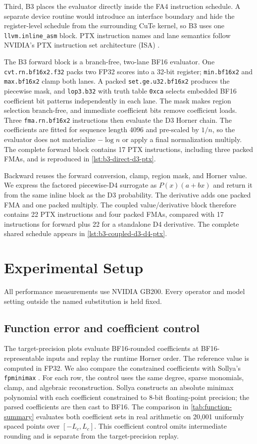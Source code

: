 \documentclass[11pt]{article}
\begin{document}
Third, B3 places the evaluator directly inside the FA4 instruction schedule.
A separate device routine would introduce an interface boundary and hide the
register-level schedule from the surrounding CuTe kernel, so B3 uses one
\texttt{llvm.inline\_asm} block. PTX instruction names and lane semantics
follow NVIDIA's PTX instruction set architecture (ISA) \cite{nvidia2026ptxisa}.

The B3 forward block is a branch-free, two-lane BF16 evaluator. One
\texttt{cvt.rn.bf16x2.f32} packs two FP32 scores into a 32-bit register;
\texttt{min.bf16x2} and \texttt{max.bf16x2} clamp both lanes. A packed
\texttt{set.ge.u32.bf16x2} produces the piecewise mask, and
\texttt{lop3.b32} with truth table \texttt{0xca} selects embedded BF16
coefficient bit patterns independently in each lane. The mask makes region
selection branch-free, and immediate coefficient bits remove coefficient
loads. Three \texttt{fma.rn.bf16x2} instructions then evaluate the D3 Horner
chain. The coefficients are fitted
for sequence length 4096 and pre-scaled by $1/n$, so the evaluator does not
materialize $-\log n$ or apply a final normalization multiply. The complete
forward block contains 17 PTX instructions, including three packed FMAs, and
is reproduced in \cref{lst:b3-direct-d3-ptx}.

Backward reuses the forward conversion, clamp, region mask, and Horner value.
We express the factored piecewise-D4 surrogate as $P(x)(a+bx)$ and
return it from the same inline block as the D3 probability. The derivative adds
one packed FMA and one packed multiply. The coupled value/derivative block
therefore contains 22 PTX instructions and four packed FMAs, compared with 17
instructions for forward plus 22 for a standalone D4 derivative. The complete
shared schedule appears in \cref{lst:b3-coupled-d3-d4-ptx}.

\section{Experimental Setup}

All performance measurements use NVIDIA GB200. Every operator and model setting
outside the named substitution is held fixed.

\subsection{Function error and coefficient control}

The target-precision plots evaluate BF16-rounded coefficients at
BF16-representable inputs and replay the runtime Horner order. The reference
value is computed in FP32. We also compare the constrained coefficients with
Sollya's \texttt{fpminimax} \cite{sollya}. For each row, the control uses the
same degree, sparse monomials, clamp, and algebraic reconstruction. Sollya
constructs an absolute minimax polynomial with each coefficient constrained to
8-bit floating-point precision; the parsed coefficients are then cast to BF16.
The comparison in \cref{tab:function-summary} evaluates both coefficient sets
in real arithmetic on 20,001 uniformly spaced points over $[-L_c,L_c]$. This
coefficient control omits intermediate rounding and is separate from the
target-precision replay.
\end{document}
